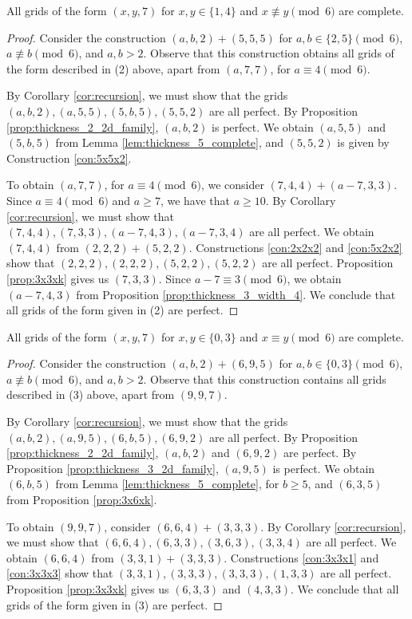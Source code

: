 \begin{lem}
\label{lem:thickness_7_case_2}
All grids of the form $(x,y,7)$ for $x,y \in \{1,4\}$ and $x \not\equiv y \pmod 6$ are complete.
\end{lem}

\begin{proof}
Consider the construction $(a,b,2) + (5,5,5)$ for $a,b \in \{2,5\} \pmod 6$, $a \not\equiv b \pmod 6$, and $a,b > 2$. Observe that this construction obtains all grids of the form described in (2) above, apart from $(a,7,7)$, for $a \equiv 4 \pmod 6$. 

By Corollary \ref{cor:recursion}, we must show that the grids $(a,b,2), (a,5,5), (5,b,5), (5,5,2)$ are all perfect. By Proposition \ref{prop:thickness_2_2d_family}, $(a,b,2)$ is perfect. We obtain $(a,5,5)$ and $(5,b,5)$ from Lemma \ref{lem:thickness_5_complete}, and $(5,5,2)$ is given by Construction \ref{con:5x5x2}.

To obtain $(a,7,7)$, for $a \equiv 4 \pmod 6$, we consider $(7,4,4) + (a-7,3,3)$. Since $a \equiv 4 \pmod 6$ and $a \geq 7$, we have that $a \geq 10$. By Corollary \ref{cor:recursion}, we must show that $(7,4,4), (7,3,3), (a-7,4,3), (a-7,3,4)$ are all perfect. We obtain $(7,4,4)$ from $(2,2,2) + (5,2,2)$. Constructions \ref{con:2x2x2} and \ref{con:5x2x2} show that $(2,2,2), (2,2,2), (5,2,2), (5,2,2)$ are all perfect. Proposition \ref{prop:3x3xk} gives us $(7,3,3)$. Since $a-7 \equiv 3 \pmod 6$, we obtain $(a-7,4,3)$ from Proposition \ref{prop:thickness_3_width_4}. We conclude that all grids of the form given in (2) are perfect. 
\end{proof}

\begin{lem}
\label{lem:thickness_7_case_3}
All grids of the form $(x,y,7)$ for $x,y \in \{0,3\}$ and $x \equiv y \pmod 6$ are complete.
\end{lem}

\begin{proof}
Consider the construction $(a,b,2) + (6,9,5)$ for $a,b \in \{0,3\} \pmod 6$, $a \not\equiv b \pmod 6$, and $a,b > 2$. Observe that this construction contains all grids described in (3) above, apart from $(9,9,7)$. 

By Corollary \ref{cor:recursion}, we must show that the grids $(a,b,2), (a,9,5), (6,b,5), (6,9,2)$ are all perfect. By Proposition \ref{prop:thickness_2_2d_family}, $(a,b,2)$ and $(6,9,2)$ are perfect. By Proposition \ref{prop:thickness_3_2d_family}, $(a,9,5)$ is perfect. We obtain $(6,b,5)$ from Lemma \ref{lem:thickness_5_complete}, for $b \geq 5$, and $(6,3,5)$ from Proposition \ref{prop:3x6xk}. 

To obtain $(9,9,7)$, consider $(6,6,4) + (3,3,3)$. By Corollary \ref{cor:recursion}, we must show that $(6,6,4), (6,3,3), (3,6,3), (3,3,4)$ are all perfect. We obtain $(6,6,4)$ from $(3,3,1) + (3,3,3)$. Constructions \ref{con:3x3x1} and \ref{con:3x3x3} show that $(3,3,1), (3,3,3), (3,3,3), (1,3,3)$ are all perfect. Proposition \ref{prop:3x3xk} gives us $(6,3,3)$ and $(4,3,3)$. We conclude that all grids of the form given in (3) are perfect.
\end{proof}

